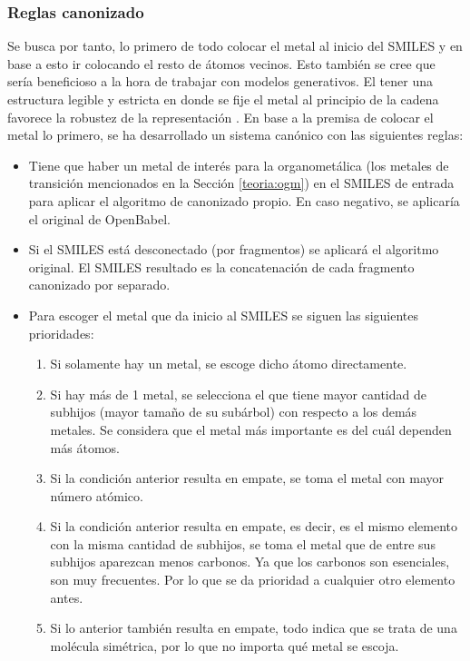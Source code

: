 \subsubsection{Reglas canonizado} \label{reglas_canonizado}

Se busca por tanto, lo primero de todo colocar el metal al inicio del SMILES y en base a esto ir colocando el resto de átomos vecinos. Esto también se cree que sería beneficioso a la hora de trabajar con modelos generativos. El tener una estructura legible y estricta en donde se fije el metal al principio de la cadena favorece la robustez de la representación \cite{SELFIES, krenn_self_referencing_2020}.
En base a la premisa de colocar el metal lo primero, se ha desarrollado un sistema canónico con las siguientes reglas:
\begin{itemize}
    \item Tiene que haber un metal de interés para la organometálica (los metales de transición mencionados en la Sección \ref{teoria:ogm}) en el SMILES de entrada para aplicar el algoritmo de canonizado propio. En caso negativo, se aplicaría el original de OpenBabel. 
    \item Si el SMILES está desconectado (por fragmentos) se aplicará el algoritmo original. El SMILES resultado es la concatenación de cada fragmento canonizado por separado.
    \item Para escoger el metal que da inicio al SMILES se siguen las siguientes prioridades:
        \begin{enumerate}
            \item Si solamente hay un metal, se escoge dicho átomo directamente.
            \item Si hay más de 1 metal, se selecciona el que tiene mayor cantidad de subhijos (mayor tamaño de su subárbol) con respecto a los demás metales. Se considera que el metal más importante es del cuál dependen más átomos.
            \item Si la condición anterior resulta en empate, se toma el metal con mayor número atómico.
            \item Si la condición anterior resulta en empate, es decir, es el mismo elemento con la misma cantidad de subhijos, se toma el metal que de entre sus subhijos aparezcan menos carbonos. Ya que los carbonos son esenciales, son muy frecuentes. Por lo que se da prioridad a cualquier otro elemento antes.
            \item Si lo anterior también resulta en empate, todo indica que se trata de una molécula simétrica, por lo que no importa qué metal se escoja.
        \end{enumerate}
\end{itemize}


